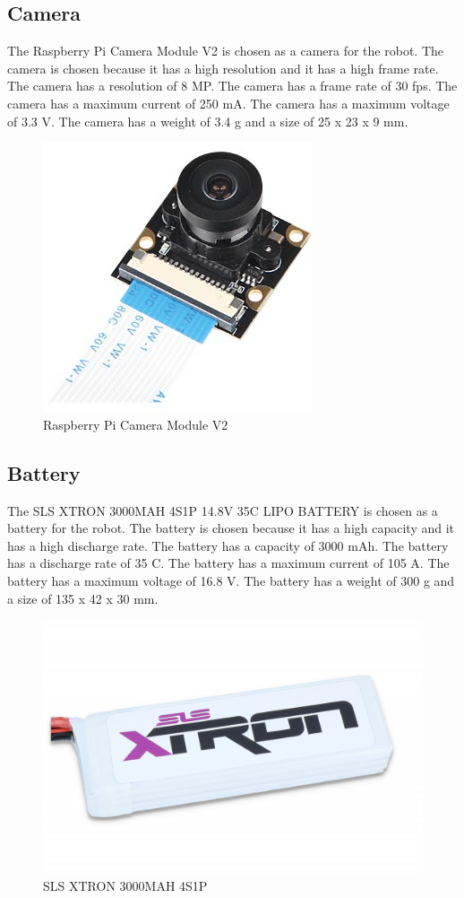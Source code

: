 \subsection{Camera}
The Raspberry Pi Camera Module V2 is chosen as a camera for the robot. The camera is chosen because it has a high resolution and it has a high frame rate. The camera has a resolution of 8 MP. The camera has a frame rate of 30 fps. The camera has a maximum current of 250 mA. The camera has a maximum voltage of 3.3 V. The camera has a weight of 3.4 g and a size of 25 x 23 x 9 mm.
\begin{figure}[h]
	\centering
	\includegraphics[width=0.5\linewidth]{Raspberry_Pi_Camera_Module_V2}
	\caption[Raspberry Pi Camera Module V2]{Raspberry Pi Camera Module V2}
	\label{fig:Raspberry_Pi_Camera_Module_V2}
\end{figure}
\subsection{Battery}
The SLS XTRON 3000MAH 4S1P 14.8V 35C LIPO BATTERY is chosen as a battery for the robot. The battery is chosen because it has a high capacity and it has a high discharge rate. The battery has a capacity of 3000 mAh. The battery has a discharge rate of 35 C. The battery has a maximum current of 105 A. The battery has a maximum voltage of 16.8 V. The battery has a weight of 300 g and a size of 135 x 42 x 30 mm.
\begin{figure}[h]
	\centering
	\includegraphics[width=0.5\linewidth]{SLS_XTRON_3000MAH_4S1P}
	\caption[SLS XTRON 3000MAH 4S1P]{SLS XTRON 3000MAH 4S1P}
	\label{fig:SLS_XTRON_3000MAH_4S1P}
\end{figure}



